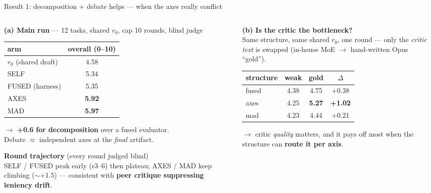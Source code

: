 \documentclass[aspectratio=169,10pt]{beamer}
\newcommand{\hl}[1]{\textbf{\color{navymain}#1}}
\newcommand{\gd}[1]{\textbf{\color{winner}#1}}
\begin{document}
\begin{frame}{Result 1: decomposition + debate helps --- when the axes really conflict}
\scriptsize
\begin{columns}[T,onlytextwidth]
\begin{column}{0.47\textwidth}
\textbf{\color{navymain}(a) Main run} --- 12 tasks, shared $r_0$, cap 10 rounds, blind judge
\begin{center}
\begin{tabular}{@{}lc@{}}
\toprule
arm & overall (0--10) \\
\midrule
$r_0$ (shared draft) & 4.58 \\
SELF                 & 5.34 \\
FUSED (harness)      & 5.35 \\
AXES                 & \gd{5.92} \\
MAD                  & \gd{5.97} \\
\bottomrule
\end{tabular}
\end{center}
\vspace{0.2em}
$\rightarrow$ \hl{+0.6 for decomposition} over a fused evaluator.\\
Debate $\approx$ independent axes at the \emph{final} artifact.

\vspace{0.4em}
\textbf{\color{navymain}Round trajectory} (every round judged blind)\\
SELF / FUSED peak early (r3--6) then plateau;
AXES / MAD keep climbing ($\sim$+1.5) --- consistent with
\hl{peer critique suppressing leniency drift}.
\end{column}

\begin{column}{0.5\textwidth}
\textbf{\color{navymain}(b) Is the critic the bottleneck?}\\
Same structure, same shared $r_0$, one round ---
only the \emph{critic text} is swapped (in-house MoE $\rightarrow$ hand-written Opus ``gold'').
\begin{center}
\begin{tabular}{@{}lccc@{}}
\toprule
structure & weak & gold & $\Delta$ \\
\midrule
fused & 4.38 & 4.75 & +0.38 \\
axes  & 4.25 & \gd{5.27} & \gd{+1.02} \\
mad   & 4.23 & 4.44 & +0.21 \\
\bottomrule
\end{tabular}
\end{center}
\vspace{0.3em}
$\rightarrow$ critic \emph{quality} matters, and it pays off most
when the structure can \hl{route it per axis}.


\end{column}
\end{columns}
\end{frame}
\end{document}
